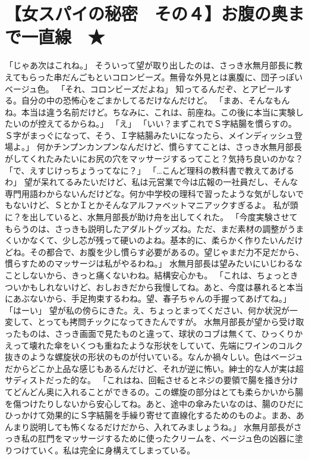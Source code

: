 \section{【女スパイの秘密　その４】お腹の奥まで一直線　★}

「じゃあ次はこれね。」
そういって望が取り出したのは、さっき水無月部長に教えてもらった串だんごもといコロンビーズ。無骨な外見とは裏腹に、団子っぽいベージュ色。
「それ、コロンビーズだよね」
知ってるんだぞ、とアピールする。自分の中の恐怖心をごまかしてるだけなんだけど。
「まあ、そんなもんね。本当は違う名前だけど。ちなみに、これは、前座ね。この後に本当に実験したいのが控えてるからね。」
「え」
「いい？まずこれでＳ字結腸を慣らすの。Ｓ字がまっぐになって、そう、Ｉ字結腸みたいになったら、メインディッシュ登場よ。」
何かチンプンカンプンなんだけど、慣らすてことは、さっき水無月部長がしてくれたみたいにお尻の穴をマッサージするってこと？気持ち良いのかな？
「で、えすじけっちょうってなに？」
「…こんど理科の教科書で教えてあげるわ」
望が呆れてるみたいだけど、私は元営業で今は広報の一社員だし、そんな専門用語わからないんだけどな。何か中学校の理科で習ったような気がしないでもないけど、ＳとかＩとかそんなアルファベットマニアックすぎるよ。
私が頭に？を出していると、水無月部長が助け舟を出してくれた。
「今度実験させてもらうのは、さっきも説明したアダルトグッズね。ただ、まだ素材の調整がうまくいかなくて、少し芯が残って硬いのよね。基本的に、柔らかく作りたいんだけどね。その都合で、お腹を少し慣らす必要があるの。望じゃまだ力不足だから、慣らすためのマッサージは私がやるわね。」
水無月部長は望みたいにいじわるなことしないから、きっと痛くないわね。結構安心かも。
「これは、ちょっときついかもしれないけど、おしおきだから我慢してね。あと、今度は暴れると本当にあぶないから、手足拘束するわね。望、春子ちゃんの手握ってあげてね。」
「はーい」
望が私の傍らにきた。え、ちょっとまってください、何か状況が一変して、とっても拷問チックになってきたんですが。
水無月部長が望から受け取ったものは、さっき画面で見たものと違って、球状のコブは無くて、ひっくりかえって壊れた傘をいくつも重ねたような形状をしていて、先端にワインのコルク抜きのような螺旋状の形状のものが付いている。なんか禍々しい。色はベージュだからどこか上品な感じもあるんだけど、それが逆に怖い。紳士的な人が実は超サディストだった的な。
「これはね、回転させるとネジの要領で腸を掻き分けてどんどん奥に入れることができるの。この螺旋の部分はとても柔らかいから腸を傷つけたりしないから安心してね。あと、途中の傘みたいなのは、腸のひだにひっかけて効果的にＳ字結腸を手繰り寄せて直線化するためのものよ。まあ、あんまり説明しても怖くなるだけだから、入れてみましょうね。」
水無月部長がさっき私の肛門をマッサージするために使ったクリームを、ベージュ色の凶器に塗りつけていく。私は完全に身構えてしまっている。
